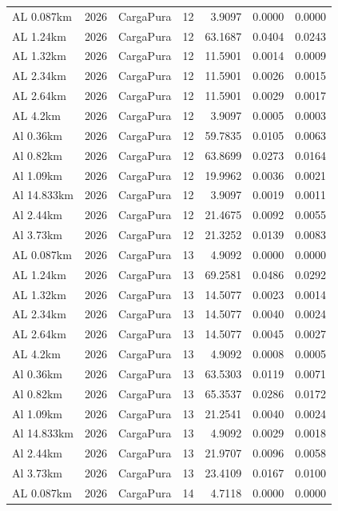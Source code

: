 \documentclass[11pt,a4paper]{article}
\begin{document}
\begin{longtable}{llllrrr}
AL 0.087km & 2026 & CargaPura & 12 & 3.9097 & 0.0000 & 0.0000 \\
AL 1.24km & 2026 & CargaPura & 12 & 63.1687 & 0.0404 & 0.0243 \\
AL 1.32km & 2026 & CargaPura & 12 & 11.5901 & 0.0014 & 0.0009 \\
AL 2.34km & 2026 & CargaPura & 12 & 11.5901 & 0.0026 & 0.0015 \\
AL 2.64km & 2026 & CargaPura & 12 & 11.5901 & 0.0029 & 0.0017 \\
AL 4.2km & 2026 & CargaPura & 12 & 3.9097 & 0.0005 & 0.0003 \\
Al 0.36km & 2026 & CargaPura & 12 & 59.7835 & 0.0105 & 0.0063 \\
Al 0.82km & 2026 & CargaPura & 12 & 63.8699 & 0.0273 & 0.0164 \\
Al 1.09km & 2026 & CargaPura & 12 & 19.9962 & 0.0036 & 0.0021 \\
Al 14.833km & 2026 & CargaPura & 12 & 3.9097 & 0.0019 & 0.0011 \\
Al 2.44km & 2026 & CargaPura & 12 & 21.4675 & 0.0092 & 0.0055 \\
Al 3.73km & 2026 & CargaPura & 12 & 21.3252 & 0.0139 & 0.0083 \\
AL 0.087km & 2026 & CargaPura & 13 & 4.9092 & 0.0000 & 0.0000 \\
AL 1.24km & 2026 & CargaPura & 13 & 69.2581 & 0.0486 & 0.0292 \\
AL 1.32km & 2026 & CargaPura & 13 & 14.5077 & 0.0023 & 0.0014 \\
AL 2.34km & 2026 & CargaPura & 13 & 14.5077 & 0.0040 & 0.0024 \\
AL 2.64km & 2026 & CargaPura & 13 & 14.5077 & 0.0045 & 0.0027 \\
AL 4.2km & 2026 & CargaPura & 13 & 4.9092 & 0.0008 & 0.0005 \\
Al 0.36km & 2026 & CargaPura & 13 & 63.5303 & 0.0119 & 0.0071 \\
Al 0.82km & 2026 & CargaPura & 13 & 65.3537 & 0.0286 & 0.0172 \\
Al 1.09km & 2026 & CargaPura & 13 & 21.2541 & 0.0040 & 0.0024 \\
Al 14.833km & 2026 & CargaPura & 13 & 4.9092 & 0.0029 & 0.0018 \\
Al 2.44km & 2026 & CargaPura & 13 & 21.9707 & 0.0096 & 0.0058 \\
Al 3.73km & 2026 & CargaPura & 13 & 23.4109 & 0.0167 & 0.0100 \\
AL 0.087km & 2026 & CargaPura & 14 & 4.7118 & 0.0000 & 0.0000 \\

\end{longtable}
\end{document}
